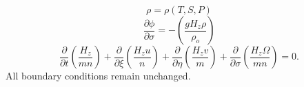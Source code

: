 \begin{equation}
  \rho = \rho(T,S,P)
\end{equation}
\begin{equation}
   \frac{\partial \phi}{\partial \sigma} = -\left( \frac{gH_z \rho}
   {\rho_o} \right)
\label{st16}
\end{equation}
\begin{equation}
   \frac{\partial}{\partial t} \left( \frac{H_z}{mn} \right) +
   \frac{\partial}{\partial \xi} \left( \frac{H_z u}{n} \right) +
   \frac{\partial}{\partial \eta} \left( \frac{H_z v}{m} \right) +
   \frac{\partial}{\partial \sigma}\left( \frac{H_z \Omega}{mn} \right)
   = 0.
\label{st17}
\end{equation}
All boundary conditions remain unchanged.
